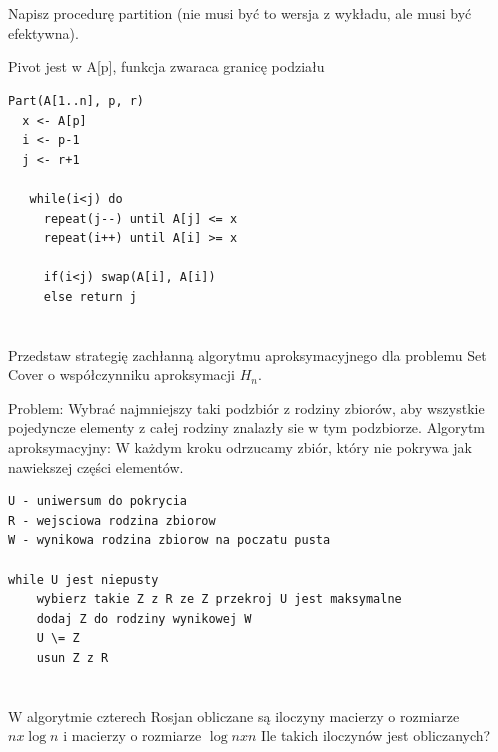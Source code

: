 \documentclass[svgnames]{report}
\begin{document}
\section{}
\begin{framed}
Napisz procedurę partition (nie musi być to wersja z wykładu, ale musi być efektywna).
\end{framed}
Pivot jest w A[p], funkcja zwaraca granicę podziału
\begin{lstlisting}
Part(A[1..n], p, r)
  x <- A[p] 
  i <- p-1 
  j <- r+1
  
   while(i<j) do
     repeat(j--) until A[j] <= x
     repeat(i++) until A[i] >= x
    
     if(i<j) swap(A[i], A[i])
     else return j 
\end{lstlisting}
\section{}
\begin{framed}
Przedstaw strategię zachłanną algorytmu aproksymacyjnego dla problemu Set Cover o współczynniku aproksymacji $H_n$.
\end{framed}
Problem: Wybrać najmniejszy taki podzbiór z rodziny zbiorów, aby wszystkie pojedyncze elementy z całej rodziny znalazły sie w tym podzbiorze.
Algorytm aproksymacyjny: W każdym kroku odrzucamy zbiór, który nie pokrywa jak nawiekszej części elementów.
\begin{lstlisting}
U - uniwersum do pokrycia
R - wejsciowa rodzina zbiorow
W - wynikowa rodzina zbiorow na poczatu pusta

while U jest niepusty
    wybierz takie Z z R ze Z przekroj U jest maksymalne
    dodaj Z do rodziny wynikowej W
    U \= Z
    usun Z z R
\end{lstlisting}

\section{}
\begin{framed}
W algorytmie czterech Rosjan obliczane są iloczyny macierzy o rozmiarze $ n x \log n$ i macierzy o rozmiarze $ \log n x n$ Ile takich iloczynów jest obliczanych?
\end{framed}
\end{document}
